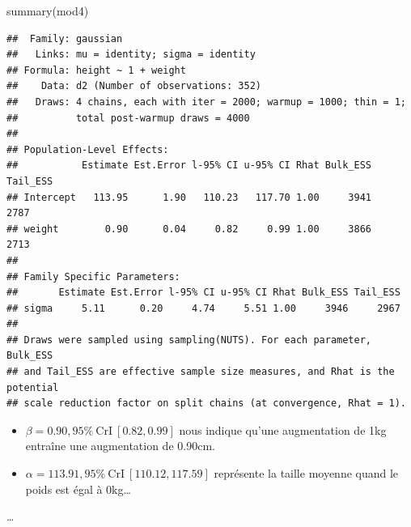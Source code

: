 \documentclass[
  a4paper,11pt,twoside,onecolumn,openright,final,oldfontcommands]{memoir}
\newenvironment{Shaded}{\begin{snugshade}}{\end{snugshade}}
\newcommand{\AttributeTok}[1]{\textcolor[rgb]{0.77,0.63,0.00}{#1}}
\newcommand{\DecValTok}[1]{\textcolor[rgb]{0.00,0.00,0.81}{#1}}
\newcommand{\FunctionTok}[1]{\textcolor[rgb]{0.00,0.00,0.00}{#1}}
\newcommand{\NormalTok}[1]{#1}
\newcommand{\OtherTok}[1]{\textcolor[rgb]{0.56,0.35,0.01}{#1}}
\newcommand{\SpecialCharTok}[1]{\textcolor[rgb]{0.00,0.00,0.00}{#1}}
\providecommand{\tightlist}{%
  \setlength{\itemsep}{0pt}\setlength{\parskip}{0pt}}
\theoremstyle{definition}
\theoremstyle{definition}
\theoremstyle{definition}
\theoremstyle{definition}
\theoremstyle{remark}
\begin{document}
\begin{Shaded}
\begin{Highlighting}[]
\FunctionTok{summary}\NormalTok{(mod4)}
\end{Highlighting}
\end{Shaded}

\begin{verbatim}
##  Family: gaussian 
##   Links: mu = identity; sigma = identity 
## Formula: height ~ 1 + weight 
##    Data: d2 (Number of observations: 352) 
##   Draws: 4 chains, each with iter = 2000; warmup = 1000; thin = 1;
##          total post-warmup draws = 4000
## 
## Population-Level Effects: 
##           Estimate Est.Error l-95% CI u-95% CI Rhat Bulk_ESS Tail_ESS
## Intercept   113.95      1.90   110.23   117.70 1.00     3941     2787
## weight        0.90      0.04     0.82     0.99 1.00     3866     2713
## 
## Family Specific Parameters: 
##       Estimate Est.Error l-95% CI u-95% CI Rhat Bulk_ESS Tail_ESS
## sigma     5.11      0.20     4.74     5.51 1.00     3946     2967
## 
## Draws were sampled using sampling(NUTS). For each parameter, Bulk_ESS
## and Tail_ESS are effective sample size measures, and Rhat is the potential
## scale reduction factor on split chains (at convergence, Rhat = 1).
\end{verbatim}

\begin{itemize}
\tightlist
\item
  \(\beta = 0.90, 95\% \ \text{CrI} \ [0.82, 0.99]\) nous indique qu'une augmentation de 1kg entraîne une augmentation de 0.90cm.
\item
  \(\alpha = 113.91, 95\% \ \text{CrI} \ [110.12, 117.59]\) représente la taille moyenne quand le poids est égal à 0kg\ldots{}
\end{itemize}

\ldots{}

\begin{Shaded}
\end{Shaded}
\end{document}
